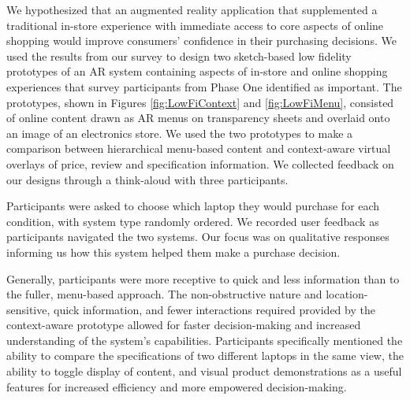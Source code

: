 We hypothesized that an augmented reality application that supplemented a traditional in-store experience with immediate access to core aspects of online shopping would improve consumers' confidence in their purchasing decisions.   We used the results from our survey to design two sketch-based low fidelity prototypes of an AR system containing aspects of in-store and online shopping experiences that survey participants from Phase One identified as important. The prototypes, shown in Figures \ref{fig:LowFiContext} and \ref{fig:LowFiMenu}, consisted of online content drawn as AR menus on transparency sheets and overlaid onto an image of an electronics store. 
We used the two prototypes to make a comparison between hierarchical menu-based content and context-aware virtual overlays of price, review and specification information. We collected feedback on our designs through a think-aloud with three participants.

Participants were asked to choose which laptop they would purchase for each condition, with system type randomly ordered.    We recorded user feedback as participants navigated the two systems. Our focus was on qualitative responses informing us how this system helped them make a purchase decision.

Generally, participants were more receptive to quick and less information than to the fuller, menu-based approach. The non-obstructive nature and location-sensitive, quick information, and fewer interactions required provided by the context-aware prototype allowed for faster decision-making and increased understanding of the system's capabilities.  Participants specifically mentioned the ability to compare the specifications of two different laptops in the same view, the ability to toggle display of content, and visual product demonstrations as a useful features for increased efficiency and more empowered decision-making.

